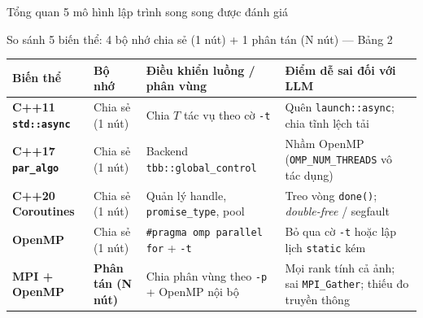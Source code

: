 \documentclass[aspectratio=169,10pt]{beamer}
\newcommand{\code}[1]{\texttt{\color{BlueDark}#1}}
\begin{document}
\begin{frame}{Tổng quan 5 mô hình lập trình song song được đánh giá}
\begin{bluebox}[top=8pt,bottom=8pt]{So sánh 5 biến thể: 4 bộ nhớ chia sẻ (1 nút) + 1 phân tán (N nút) --- Bảng 2}
  \footnotesize
  \renewcommand{\arraystretch}{1.52}
  \begin{tabularx}{\textwidth}{@{}>{\bfseries\color{BlueDark}}l l >{\raggedright\arraybackslash}p{4.35cm} >{\raggedright\arraybackslash}X@{}}
    \toprule
    \textbf{Biến thể} & \textbf{Bộ nhớ} & \textbf{Điều khiển luồng / phân vùng} & \textbf{Điểm dễ sai đối với LLM} \\
    \midrule
    C++11 \code{std::async} & Chia sẻ (1 nút) & Chia $T$ tác vụ theo cờ \code{-t} & Quên \code{launch::async}; chia tĩnh lệch tải \\
    C++17 \code{par\_algo} & Chia sẻ (1 nút) & Backend \code{tbb::global\_control} & Nhầm OpenMP (\code{OMP\_NUM\_THREADS} vô tác dụng) \\
    C++20 Coroutines & Chia sẻ (1 nút) & Quản lý handle, \code{promise\_type}, pool & Treo vòng \code{done()}; \emph{double-free} / segfault \\
    OpenMP & Chia sẻ (1 nút) & \code{\#pragma omp parallel for} + \code{-t} & Bỏ qua cờ \code{-t} hoặc lập lịch \code{static} kém \\
    \midrule
    MPI + OpenMP & \textcolor{BlueMid}{\bfseries Phân tán (N nút)} & Chia phân vùng theo \code{-p} + OpenMP nội bộ & Mọi rank tính cả ảnh; sai \code{MPI\_Gather}; thiếu đo truyền thông \\
    \bottomrule
  \end{tabularx}
\end{bluebox}
\end{frame}
\end{document}
